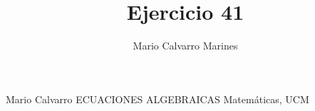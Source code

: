\documentclass[10pt,a4paper,openright]{book}
\title{Ejercicio 41}
\author{Mario Calvarro Marines}
\date{}
\begin{document}
\mainmatter
\noindent Mario Calvarro \hfill {\Large ECUACIONES ALGEBRAICAS} \hfill Matemáticas, UCM


{}

\end{document}
